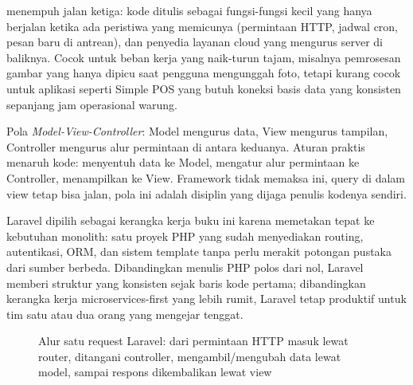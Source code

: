  menempuh jalan ketiga: kode ditulis sebagai fungsi-fungsi
kecil yang hanya berjalan ketika ada peristiwa yang memicunya (permintaan
HTTP, jadwal cron, pesan baru di antrean), dan penyedia layanan cloud yang
mengurus server di baliknya. Cocok untuk beban kerja yang naik-turun tajam,
misalnya pemrosesan gambar yang hanya dipicu saat pengguna mengunggah foto,
tetapi kurang cocok untuk aplikasi seperti Simple POS yang butuh koneksi
basis data yang konsisten sepanjang jam operasional warung.

\begin{istilahpenting}
\begin{description}[leftmargin=0pt,style=nextline]
  \item[MVC] Pola \textit{Model-View-Controller}: Model mengurus data, View mengurus tampilan, Controller mengurus alur permintaan di antara keduanya. Aturan praktis menaruh kode: menyentuh data ke Model, mengatur alur permintaan ke Controller, menampilkan ke View. Framework tidak memaksa ini, query di dalam view tetap bisa jalan, pola ini adalah disiplin yang dijaga penulis kodenya sendiri.
\end{description}
\end{istilahpenting}

Laravel dipilih sebagai kerangka kerja buku ini karena memetakan tepat ke
kebutuhan monolith: satu proyek PHP yang sudah menyediakan routing,
autentikasi, ORM, dan sistem template tanpa perlu merakit potongan pustaka
dari sumber berbeda. Dibandingkan menulis PHP polos dari nol, Laravel
memberi struktur  yang konsisten sejak baris kode pertama; dibandingkan
kerangka kerja microservices-first yang lebih rumit, Laravel tetap
produktif untuk tim satu atau dua orang yang mengejar tenggat.

\begin{figure}[htbp]
\centering
{}
\caption{Alur satu request Laravel: dari permintaan HTTP masuk lewat
router, ditangani controller, mengambil/mengubah data lewat model, sampai
respons dikembalikan lewat view}
\label{fig:laravel-lifecycle}
\end{figure}

